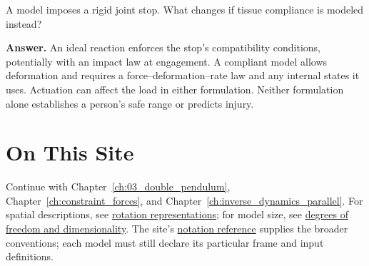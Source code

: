 A model imposes a rigid joint stop. What changes if tissue compliance is modeled instead?

\textbf{Answer.} An ideal reaction enforces the stop's compatibility conditions, potentially with an impact law at engagement. A compliant model allows deformation and requires a force--deformation--rate law and any internal states it uses. Actuation can affect the load in either formulation. Neither formulation alone establishes a person's safe range or predicts injury.

\section{On This Site}\label{ch02:on-this-site}

\protect{}\label{ch02:related-reading}{}

\protect{}\label{ch02:quarto-bibliography}{}

Continue with Chapter~\ref{ch:03_double_pendulum}, Chapter~\ref{ch:constraint_forces}, and Chapter~\ref{ch:inverse_dynamics_parallel}. For spatial descriptions, see \href{https://affinedrift.com/articles/rotation-representations-reference.html}{rotation representations}; for model size, see \href{https://affinedrift.com/articles/degrees-of-freedom-and-dimensionality.html}{degrees of freedom and dimensionality}. The site's \href{https://affinedrift.com/pages/notation.html}{notation reference} supplies the broader conventions; each model must still declare its particular frame and input definitions.
